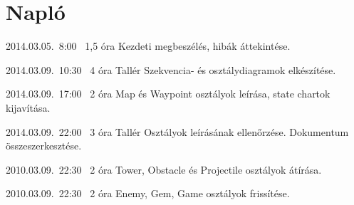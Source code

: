 %
\section{Napló}

\begin{naplo}


\bejegyzes
{2014.03.05.~8:00~} %
{1,5 óra} %
{\vadam\newline
\vantal\newline
\vbator\newline
\vtorok} %
{Kezdeti megbeszélés, hibák áttekintése.} %

\bejegyzes
{2014.03.09.~10:30~} %
{4 óra} %
{Tallér} %
{Szekvencia- és osztálydiagramok elkészítése.}

\bejegyzes
{2014.03.09.~17:00~}
{2 óra}
{\vadam}
{Map és Waypoint osztályok leírása, state chartok kijavítása.}

\bejegyzes
{2014.03.09.~22:00~} %
{3 óra} %
{Tallér} %
{Osztályok leírásának ellenőrzése. Dokumentum összeszerkesztése.}

\bejegyzes
{2010.03.09.~22:30~}
{2 óra}
{\vadam}
{Tower, Obstacle és Projectile osztályok átírása.}

\bejegyzes
{2010.03.09.~22:30~}
{2 óra}
{\vantal}
{Enemy, Gem, Game osztályok frissítése.}

\end{naplo}

